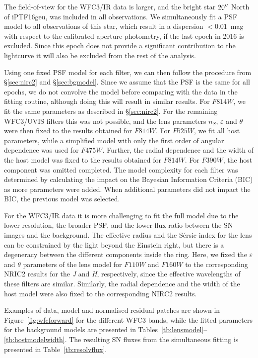 \documentclass[a4paper,fleqn,usenatbib]{mnras}
\newcommand{\geu}{iPTF16geu\xspace}
\newcommand{\sn}{SN\xspace}
\newcommand{\wfc}{WFC3\xspace}
\newcommand{\wfcuvis}{WFC3/UVIS\xspace}
\newcommand{\wfcir}{WFC3/IR\xspace}
\newcommand{\jband}{{\it J}\xspace}
\newcommand{\hband}{{\it H}\xspace}
\newcommand{\hstu}{$F390W$\xspace}
\newcommand{\hstb}{$F475W$\xspace}
\newcommand{\hstr}{$F625W$\xspace}
\newcommand{\hsti}{$F814W$\xspace}
\newcommand{\hstj}{$F110W$\xspace}
\newcommand{\hsth}{$F160W$\xspace}
\begin{document}
The field-of-view for the \wfcir data is larger, and the bright star $20\hbox{$^{\prime\prime}$}$ North of \geu, was included in all observations.
We simultaneously fit a PSF model to all observations of this star, which result in a dispersion $<0.01$~mag with 
respect to the calibrated aperture photometry, if the last epoch in 2016 is excluded.  Since this epoch does not provide a significant 
contribution to the lightcurve it will also be excluded from the rest of the analysis.

Using one fixed PSF model for each filter, we can then follow the procedure from \S\ref{sec:nirc2} and \S\ref{sec:bgmodel}.  Since 
we assume that the PSF is the same for all epochs, we do not convolve the model before comparing with the data in the 
fitting routine, although doing this will result in similar results.  For \hsti, we fit the same parameters as described in \S\ref{sec:nirc2}.
For the remaining \wfcuvis filters this was not possible, and the lens parameters $n_S$, $\varepsilon$ and $\theta$ were then fixed to the
results obtained for \hsti.  For \hstr, we fit all host parameters, while a simplified model with only the first order of angular dependence 
was used for \hstb.  Further, the radial dependence and the width of the host model was fixed to the results obtained for \hsti.  
For \hstu, the host component was omitted completed.  The model complexity for each filter was determined by calculating the 
impact on the Bayesian Information Criteria (BIC) as more parameters were added.  When additional parameters did not impact the BIC,
the previous model was selected.

For the \wfcir data it is more challenging to fit the full model due to the lower resolution, the broader PSF, and the lower flux ratio 
between the \sn images and the background.   The effective radius and the S\'ersic index for the lens can be constrained by the 
light beyond the Einstein right, but there is a degeneracy between the different components inside the ring.  Here, we fixed the 
$\varepsilon$ and $\theta$ parameters of the lens model for \hstj and \hsth to the corresponding NRIC2 results for the 
\jband and \hband, respectively, since the effective wavelengths of these filters are similar.  Similarly, the radial dependence and the width
of the host model were also fixed to the corresponding NIRC2 results.

Examples of data, model and normalised residual patches are shown in Figure~\ref{fig:wfcforward} for the different \wfc bands, while 
the fitted parameters for the background models are presented in Tables~\ref{tb:lensmodel}--\ref{tb:hostmodelwidth}.  
The resulting \sn fluxes from the simultaneous fitting is presented in Table~\ref{tb:resolvflux}.
\end{document}
